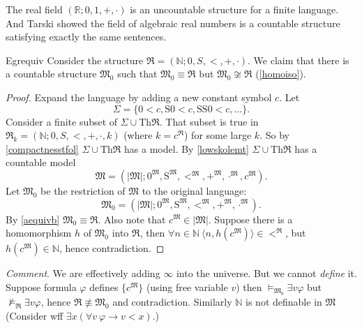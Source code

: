 The real field $(\mathbb{R};0,1,+,\cdot)$ is an uncountable structure for a finite language. And Tarski showed the field of algebraic real numbers is a countable structure satisfying exactly the same sentences.

\begin{reference}{Eg}{requiv}
  Consider the structure $\mathfrak{R}=(\mathbb{N};0,S,<,+,\cdot).$ We claim that there is a countable structure $\mathfrak{M}_0$ such that $\mathfrak{M}_0\equiv \mathfrak{R}$ but $\mathfrak{M}_0\not\cong \mathfrak{R}$ (\ref{homoiso}).
\end{reference}

\begin{proof}
  Expand the language by adding a new constant symbol $c$. Let
  \[
    \Sigma=\{0<c,\mathrm{S}0<c,\mathrm{SS}0<c,\dots\}.
  \]
  Consider a finite subset of $\Sigma\cup \mathrm{Th}\mathfrak{R}$. That subset is true in $\mathfrak{R}_k=(\mathbb{N};0,S,<,+,\cdot,k)$ (where $k=c^{\mathfrak{R}}$) for some large $k$. So by \ref{compactnesstfol} $\Sigma\cup \mathrm{Th}\mathfrak{R}$ has a model. By \ref{lowskolemt} $\Sigma\cup \mathrm{Th}\mathfrak{R}$ has a countable model
  \[
    \mathfrak{M}=(|\mathfrak{M}|;0^{\mathfrak{M}},\mathrm{S}^{\mathfrak{M}}, <^{\mathfrak{M}}, +^{\mathfrak{M}}, \cdot^{\mathfrak{M}}, c^{\mathfrak{M}}).
  \]
  Let $\mathfrak{M}_0$ be the restriction of $\mathfrak{M}$ to the original language:
  \[
    \mathfrak{M}_0=(|\mathfrak{M}|;0^{\mathfrak{M}},\mathrm{S}^{\mathfrak{M}}, <^{\mathfrak{M}}, +^{\mathfrak{M}}, \cdot^{\mathfrak{M}}).
  \]
  By \ref{aequivb} $\mathfrak{M}_0\equiv \mathfrak{R}$. Also note that $c^{\mathfrak{M}}\in|\mathfrak{M}|$. Suppose there is a homomorphism $h$ of $\mathfrak{M}_0$ into $\mathfrak{R}$, then $\forall n\in \mathbb{N}\ \langle n,h(c^{\mathfrak{M}})\rangle\in <^\mathfrak{R}$, but $h(c^{\mathfrak{M}})\in \mathbb{N}$, hence contradiction.
\end{proof}

\textit{Comment}. We are effectively adding $\infty$ into the universe. But we cannot \textit{define} it. Suppose formula $\varphi$ defines $\{c^{\mathfrak{M}}\}$ (using free variable $v$) then $\vDash_{\mathfrak{M}_0}\exists v \varphi$ but $\not\vDash_{\mathfrak{R}}\exists v \varphi$, hence $\mathfrak{R}\not\equiv \mathfrak{M}_0$ and contradiction. Similarly $\mathbb{N}$ is not definable in $\mathfrak{M}$ (Consider wff $\exists x(\forall v\ \varphi\to v<x)$.)


